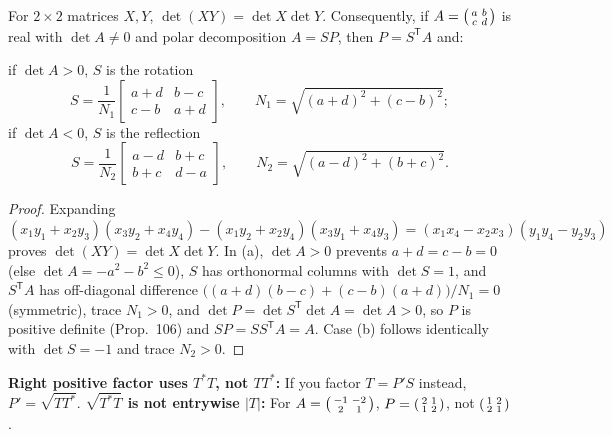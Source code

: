 \documentclass[10pt]{scrartcl}
\begin{document}
\begin{proposition*}
  For $2\times2$ matrices $X,Y$, $\det(XY)=\det X\det Y$. Consequently, if $A=\begin{psmallmatrix}a&b\\c&d\end{psmallmatrix}$ is real with $\det A\neq0$ and polar decomposition $A=SP$, then $P=S^{\mathsf T}A$ and:
  \begin{enumerate}
    \ii[(a)] if $\det A>0$, $S$ is the rotation
    \[ S=\frac{1}{N_1}\begin{bmatrix}a+d&b-c\\c-b&a+d\end{bmatrix},\qquad N_1=\sqrt{(a+d)^2+(c-b)^2}; \]
    \ii[(b)] if $\det A<0$, $S$ is the reflection
    \[ S=\frac{1}{N_2}\begin{bmatrix}a-d&b+c\\b+c&d-a\end{bmatrix},\qquad N_2=\sqrt{(a-d)^2+(b+c)^2}. \]
  \end{enumerate}
\end{proposition*}
\begin{proof}
  Expanding $(x_1y_1+x_2y_3)(x_3y_2+x_4y_4)-(x_1y_2+x_2y_4)(x_3y_1+x_4y_3)=(x_1x_4-x_2x_3)(y_1y_4-y_2y_3)$ proves $\det(XY)=\det X\det Y$. In (a), $\det A>0$ prevents $a+d=c-b=0$ (else $\det A=-a^2-b^2\le0$), $S$ has orthonormal columns with $\det S=1$, and $S^{\mathsf T}A$ has off-diagonal difference $\bigl((a+d)(b-c)+(c-b)(a+d)\bigr)/N_1=0$ (symmetric), trace $N_1>0$, and $\det P=\det S^{\mathsf T}\det A=\det A>0$, so $P$ is positive definite (Prop.~106) and $SP=SS^{\mathsf T}A=A$. Case (b) follows identically with $\det S=-1$ and trace $N_2>0$.
\end{proof}

\begin{trapbox}
  \ii \textbf{Right positive factor uses $T^*T$, not $TT^*$:} If you factor $T=P'S$ instead, $P'=\sqrt{TT^*}$.
  \ii \textbf{$\sqrt{T^*T}$ is not entrywise $|T|$:} For $A=\begin{psmallmatrix}-1&-2\\2&1\end{psmallmatrix}$, $P=\begin{psmallmatrix}2&1\\1&2\end{psmallmatrix}$, not $\begin{psmallmatrix}1&2\\2&1\end{psmallmatrix}$.
\end{trapbox}
\end{document}
